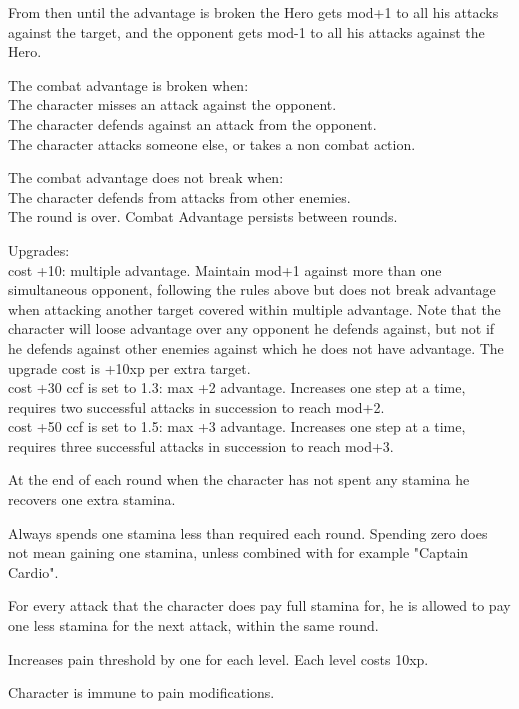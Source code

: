 From then until the advantage is broken the Hero gets mod+1 to all his attacks against the target, and the opponent gets mod-1 to all his attacks against the Hero.

The combat advantage is broken when: \\
The character misses an attack against the opponent. \\
The character defends against an attack from the opponent. \\
The character attacks someone else, or takes a non combat action.

The combat advantage does not break when: \\
The character defends from attacks from other enemies. \\
The round is over. Combat Advantage persists between rounds.

Upgrades: \\
cost +10: multiple advantage. Maintain mod+1 against more than one simultaneous opponent, following the rules above but does not break advantage when attacking another target covered within multiple advantage. Note that the character will loose advantage over any opponent he defends against, but not if he defends against other enemies against which he does not have advantage. The upgrade cost is +10xp per extra target. \\
cost +30 ccf is set to 1.3: max +2 advantage. Increases one step at a time, requires two successful attacks in succession to reach mod+2. \\
cost +50 ccf is set to 1.5: max +3 advantage. Increases one step at a time, requires three successful attacks in succession to reach mod+3.


 At the end of each round when the character has not spent any stamina he recovers one extra stamina.


 Always spends one stamina less than required each round. Spending zero does not mean gaining one stamina, unless combined with for example "Captain Cardio".


 For every attack that the character does pay full stamina for, he is allowed to pay one less stamina for the next attack, within the same round.


 Increases pain threshold by one for each level. Each level costs 10xp.


 Character is immune to pain modifications.


